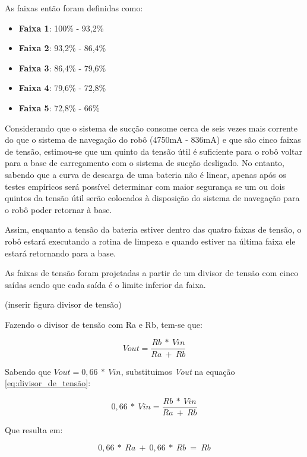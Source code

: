 		As faixas então foram definidas como:

		\begin{itemize}
			\item \textbf{Faixa 1}: 100\% - 93,2\%
			\item \textbf{Faixa 2}: 93,2\% - 86,4\%
			\item \textbf{Faixa 3}: 86,4\% - 79,6\%
			\item \textbf{Faixa 4}: 79,6\% - 72,8\%
			\item \textbf{Faixa 5}: 72,8\% - 66\%
		\end{itemize}
		
		Considerando que o sistema de sucção consome cerca de seis vezes mais corrente do que o sistema de navegação do robô (4750mA - 836mA) e que são cinco faixas de tensão, estimou-se que um quinto da tensão útil é suficiente para o robô voltar para a base de carregamento com o sistema de sucção desligado. No entanto, sabendo que a curva de descarga de uma bateria não é linear, apenas após os testes empíricos será possível determinar com maior segurança se um ou dois quintos da tensão útil serão colocados à disposição do sistema de navegação para o robô poder retornar à base. 

		Assim, enquanto a tensão da bateria estiver dentro das quatro faixas de tensão, o robô estará executando a rotina de limpeza e quando estiver na última faixa ele estará retornando para a base. 

		As faixas de tensão foram projetadas a partir de um divisor de tensão com cinco saídas sendo que cada saída é o limite inferior da faixa.

		(inserir figura divisor de tensão)

		Fazendo o divisor de tensão com Ra e Rb, tem-se que:

		\begin{equation}
		\label{eq:divisor_de_tensão}
			Vout= \frac{Rb\ *\ Vin}{Ra\ +\ Rb} 
		\end{equation}

		Sabendo que ${Vout = 0,66\ *\ Vin}$, substituimos \textit{Vout} na equação \ref{eq:divisor_de_tensão}:
		
		\begin{equation}
		\label{eq:divisor_de_tensão_2}
			0,66\ *\ Vin=\frac{Rb\ *\ Vin}{Ra\ +\ Rb} 
		\end{equation}

		Que resulta em:

		\begin{equation}
		\label{eq:divisor_de_tensão_3}
			0,66\ *\ Ra\ +\ 0,66\ *\ Rb\ =\ Rb
		\end{equation}

